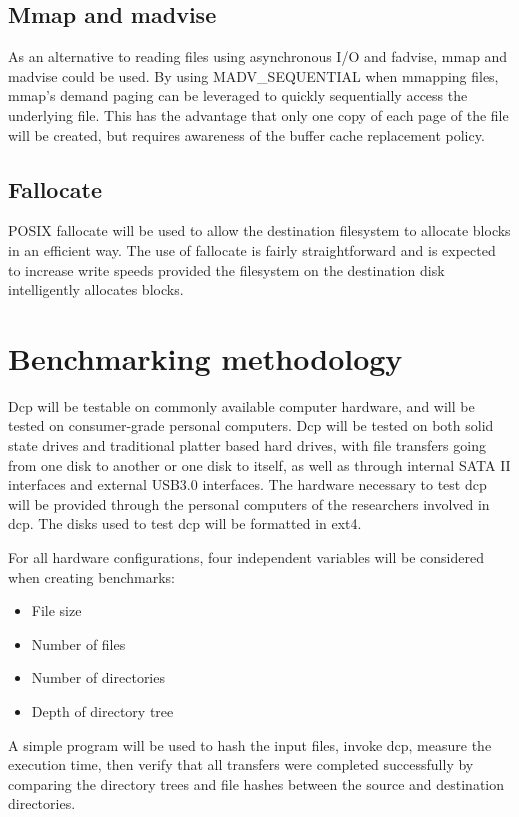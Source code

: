\documentclass[12pt]{article}
\begin{document}
\subsection{Mmap and madvise}
As an alternative to reading files using asynchronous I/O and fadvise,
mmap and madvise could be used. By using MADV\_SEQUENTIAL when mmapping
files, mmap's demand paging can be leveraged to quickly sequentially access
the underlying file. This has the advantage that only one copy of each
page of the file will be created, but requires awareness of the buffer
cache replacement policy.

\subsection{Fallocate}
POSIX fallocate will be used to allow the destination filesystem to
allocate blocks in an efficient way. The use of fallocate is
fairly straightforward and is expected to increase write speeds
provided the filesystem on the destination disk intelligently
allocates blocks.

\section{Benchmarking methodology}
Dcp will be testable on commonly available computer hardware, and will be tested on
consumer-grade personal computers. Dcp will be tested on both solid state drives
and traditional platter based hard drives, with file transfers going from one disk to
another or one disk to itself, as well as through internal SATA II interfaces and
external USB3.0 interfaces. The hardware necessary to test dcp will be provided through
the personal computers of the researchers involved in dcp. The disks used to test dcp
will be formatted in ext4.

For all hardware configurations, four independent variables will be considered when
creating benchmarks:
\begin{itemize}
    \item File size
    \item Number of files
    \item Number of directories
    \item Depth of directory tree
\end{itemize}

A simple program will be used to hash the input files, invoke dcp, measure the
execution time, then verify that all transfers were completed
successfully by comparing the directory trees and file hashes between
the source and destination directories.
\end{document}
